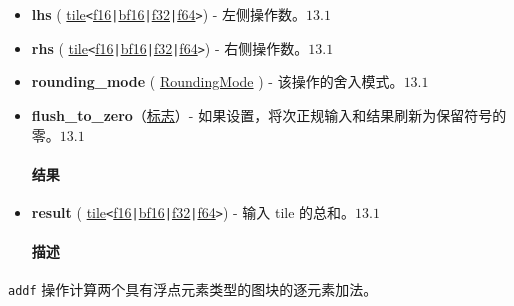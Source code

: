 \documentclass{article}
\begin{document}
\begin{itemize}
\item \textbf{lhs} ( \href{https://docs.nvidia.com/cuda/tile-ir/latest/sections/types.html#type-tile}{tile}\texttt{<}\href{https://docs.nvidia.com/cuda/tile-ir/latest/sections/types.html#subsection-element-types}{f16}\texttt{|}\href{https://docs.nvidia.com/cuda/tile-ir/latest/sections/types.html#subsection-element-types}{bf16}\texttt{|}\href{https://docs.nvidia.com/cuda/tile-ir/latest/sections/types.html#subsection-element-types}{f32}\texttt{|}\href{https://docs.nvidia.com/cuda/tile-ir/latest/sections/types.html#subsection-element-types}{f64}\texttt{>}) - 左侧操作数。$\boxed{13.1}$
\item \textbf{rhs} ( \href{https://docs.nvidia.com/cuda/tile-ir/latest/sections/types.html#type-tile}{tile}\texttt{<}\href{https://docs.nvidia.com/cuda/tile-ir/latest/sections/types.html#subsection-element-types}{f16}\texttt{|}\href{https://docs.nvidia.com/cuda/tile-ir/latest/sections/types.html#subsection-element-types}{bf16}\texttt{|}\href{https://docs.nvidia.com/cuda/tile-ir/latest/sections/types.html#subsection-element-types}{f32}\texttt{|}\href{https://docs.nvidia.com/cuda/tile-ir/latest/sections/types.html#subsection-element-types}{f64}\texttt{>}) - 右侧操作数。$\boxed{13.1}$
\item \textbf{rounding\_mode} ( \href{https://docs.nvidia.com/cuda/tile-ir/latest/sections/operations.html#op-attribute-cuda-tile-addf-roundingmode-attr}{RoundingMode} ) - 该操作的舍入模式。$\boxed{13.1}$
\item \textbf{flush\_to\_zero}（\href{https://docs.nvidia.com/cuda/tile-ir/latest/sections/operations.html#type-flag}{标志}）- 如果设置，将次正规输入和结果刷新为保留符号的零。$\boxed{13.1}$




\paragraph{结果}


\item \textbf{result} ( \href{https://docs.nvidia.com/cuda/tile-ir/latest/sections/types.html#type-tile}{tile}\texttt{<}\href{https://docs.nvidia.com/cuda/tile-ir/latest/sections/types.html#subsection-element-types}{f16}\texttt{|}\href{https://docs.nvidia.com/cuda/tile-ir/latest/sections/types.html#subsection-element-types}{bf16}\texttt{|}\href{https://docs.nvidia.com/cuda/tile-ir/latest/sections/types.html#subsection-element-types}{f32}\texttt{|}\href{https://docs.nvidia.com/cuda/tile-ir/latest/sections/types.html#subsection-element-types}{f64}\texttt{>}) - 输入 tile 的总和。$\boxed{13.1}$




\paragraph{描述}


\end{itemize}
\texttt{addf} 操作计算两个具有浮点元素类型的图块的逐元素加法。
\end{document}
